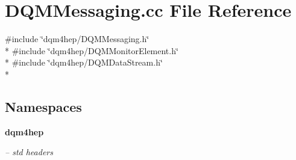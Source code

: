 \section{D\+Q\+M\+Messaging.\+cc File Reference}
\label{DQMMessaging_8cc}
{\ttfamily \#include \char`\"{}dqm4hep/\+D\+Q\+M\+Messaging.\+h\char`\"{}}\\*
{\ttfamily \#include \char`\"{}dqm4hep/\+D\+Q\+M\+Monitor\+Element.\+h\char`\"{}}\\*
{\ttfamily \#include \char`\"{}dqm4hep/\+D\+Q\+M\+Data\+Stream.\+h\char`\"{}}\\*
\subsection*{Namespaces}
\begin{DoxyCompactItemize}
\item 
 {\bf dqm4hep}
\begin{DoxyCompactList}\small\item\em -- std headers \end{DoxyCompactList}\end{DoxyCompactItemize}
